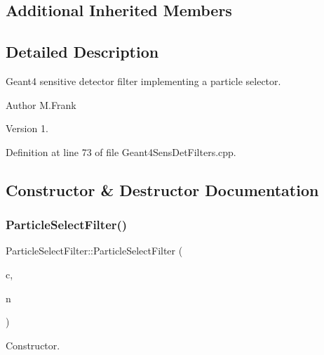 \subsection*{Additional Inherited Members}


\subsection{Detailed Description}
Geant4 sensitive detector filter implementing a particle selector. 

\begin{DoxyAuthor}{Author}
M.\+Frank 
\end{DoxyAuthor}
\begin{DoxyVersion}{Version}
1. 
\end{DoxyVersion}


Definition at line 73 of file Geant4\+Sens\+Det\+Filters.\+cpp.



\subsection{Constructor \& Destructor Documentation}
\hypertarget{struct_d_d4hep_1_1_simulation_1_1_particle_select_filter_a02e58fea6995a7e71f4ea2ea3bb4696e}{}\label{struct_d_d4hep_1_1_simulation_1_1_particle_select_filter_a02e58fea6995a7e71f4ea2ea3bb4696e} 
\subsubsection{\texorpdfstring{Particle\+Select\+Filter()}{ParticleSelectFilter()}}
{\footnotesize\ttfamily Particle\+Select\+Filter\+::\+Particle\+Select\+Filter (\begin{DoxyParamCaption}\item[{\hyperlink{class_d_d4hep_1_1_simulation_1_1_geant4_context}{Geant4\+Context} $\ast$}]{c,  }\item[{const std\+::string \&}]{n }\end{DoxyParamCaption})}



Constructor. 



